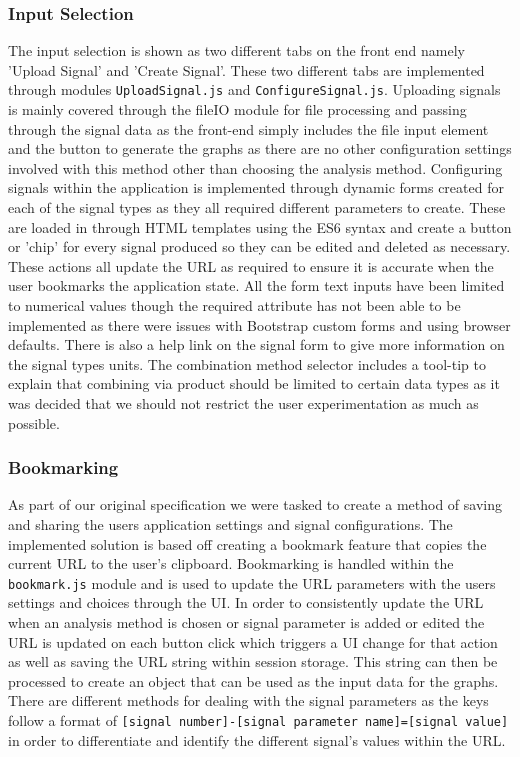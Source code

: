 \subsubsection{Input Selection}
The input selection is shown as two different tabs on the front end namely 'Upload Signal' and 'Create Signal'. These two different tabs are implemented through modules \verb|UploadSignal.js| and \verb|ConfigureSignal.js|. 
Uploading signals is mainly covered through the fileIO module for file processing and passing through the signal data as the front-end simply includes the file input element and the button to generate the 
graphs as there are no other configuration settings involved with this method other than choosing the analysis method.
Configuring signals within the application is implemented through dynamic forms created for each of the signal types as they all required different parameters to create. 
These are loaded in through HTML templates using the ES6 syntax and create a button or 'chip' for every signal produced so they can be edited and deleted as necessary. 
These actions all update the URL as required to ensure it is accurate when the user bookmarks the application state. All the form text inputs have been limited to numerical values though the required attribute has not been able to be implemented as there were issues with Bootstrap custom forms and using browser defaults. 
There is also a help link on the signal form to give more information on the signal types units. The combination method selector includes a tool-tip to explain that combining via product should be limited to certain data types as it was decided that we should not restrict the user experimentation as much as possible. 

\subsubsection{Bookmarking}
As part of our original specification we were tasked to create a method of saving and sharing the users application settings and signal configurations. The implemented solution is based off creating a bookmark 
feature that copies the current URL to the user's clipboard. Bookmarking is handled within the \verb|bookmark.js| module and is used to update the URL parameters with the users settings and choices through the UI.
 In order to consistently update the URL when an analysis method is chosen or signal parameter is added or edited the URL is updated on each button click which triggers a UI change for that action as well as saving the URL string within session storage. 
 This string can then be processed to create an object that can be used as the input data for the graphs. There are different methods for dealing with the signal parameters as the keys follow a format of \verb|[signal number]-[signal parameter name]=[signal value]| in order to differentiate and identify the different signal's values within the URL.

